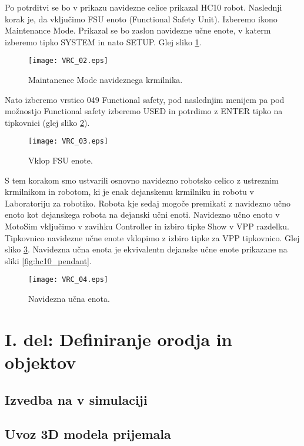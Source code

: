 Po potrditvi se bo v prikazu navidezne celice prikazal HC10 robot. Naslednji korak je, da vključimo FSU enoto (Functional Safety Unit). Izberemo ikono Maintenance Mode. Prikazal se bo zaslon navidezne učne enote, v katerm izberemo tipko SYSTEM in nato SETUP. Glej sliko \ref{fig:VRC_02}. 

\begin{figure}[hbt]
	\centering
	\texttt{[image: VRC\_02.eps]}
	\caption{Maintanence Mode navideznega krmilnika.}
	\label{fig:VRC_02}
\end{figure}

Nato izberemo vrstico 049 Functional safety, pod naslednjim menijem pa pod možnostjo Functional safety izberemo USED in potrdimo z ENTER tipko na tipkovnici (glej sliko \ref{fig:VRC_03}).

\begin{figure}[hbt]
	\centering
	\texttt{[image: VRC\_03.eps]}
	\caption{Vklop FSU enote.}
	\label{fig:VRC_03}
\end{figure}

S tem korakom smo ustvarili osnovno navidezno robotsko celico z ustreznim krmilnikom in robotom, ki je enak dejanskemu krmilniku in robotu v Laboratoriju za robotiko. Robota kje sedaj mogoče premikati z navidezno učno enoto kot dejanskega robota na dejanski učni enoti. Navidezno učno enoto v MotoSim vključimo v zavihku Controller in izbiro tipke Show v VPP razdelku. Tipkovnico navidezne učne enote vklopimo z izbiro tipke za VPP tipkovnico. Glej sliko \ref{fig:VRC_04}. Navidezna učna enota je ekvivalentn dejanske učne enote prikazane na sliki \ref{fig:hc10_pendant}.

\begin{figure}[hbt]
	\centering
	\texttt{[image: VRC\_04.eps]}
	\caption{Navidezna učna enota.}
	\label{fig:VRC_04}
\end{figure}

\clearpage

\section{I. del: Definiranje orodja in objektov}

\subsection{Izvedba na v simulaciji}

\subsection*{Uvoz 3D modela prijemala}


